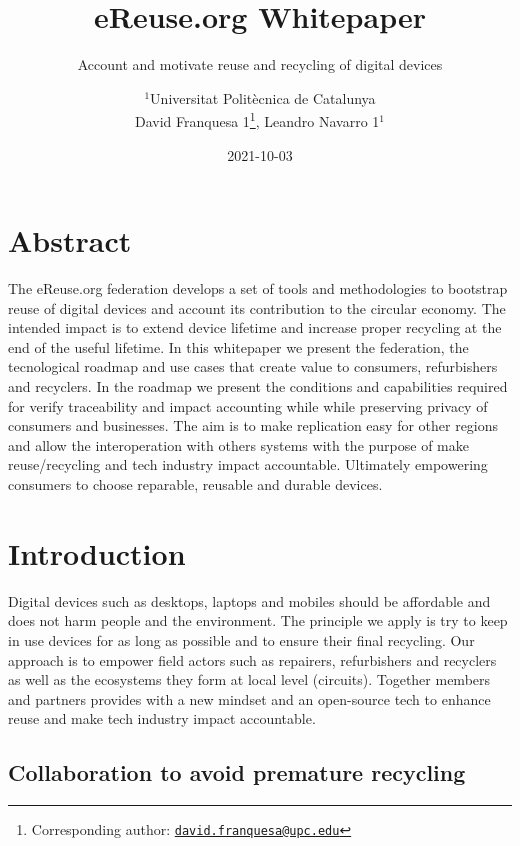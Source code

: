 \documentclass[
]{book}
\title{eReuse.org Whitepaper}
\subtitle{Account and motivate reuse and recycling of digital devices}
\author{\(^1\)Universitat Politècnica de Catalunya\\
David Franquesa 1\footnote{Corresponding author: \href{mailto:david.franquesa@upc.edu}{\nolinkurl{david.franquesa@upc.edu}}}, Leandro Navarro 1\(^1\)}
\date{2021-10-03}
\begin{document}
\maketitle

{
\setcounter{tocdepth}{1}
\tableofcontents
}
\hypertarget{abstract}{%
\chapter*{Abstract}\label{abstract}}

The eReuse.org federation develops a set of tools and methodologies to bootstrap reuse of digital devices and account its contribution to the circular economy. The intended impact is to extend device lifetime and increase proper recycling at the end of the useful lifetime. In this whitepaper we present the federation, the tecnological roadmap and use cases that create value to consumers, refurbishers and recyclers. In the roadmap we present the conditions and capabilities required for verify traceability and impact accounting while while preserving privacy of consumers and businesses. The aim is to make replication easy for other regions and allow the interoperation with others systems with the purpose of make reuse/recycling and tech industry impact accountable. Ultimately empowering consumers to choose reparable, reusable and durable devices.

\hypertarget{introduction}{%
\chapter{Introduction}\label{introduction}}

Digital devices such as desktops, laptops and mobiles should be affordable and does not harm people and the environment. The principle we apply is try to keep in use devices for as long as possible and to ensure their final recycling. Our approach is to empower field actors such as repairers, refurbishers and recyclers as well as the ecosystems they form at local level (circuits). Together members and partners provides with a new mindset and an open-source tech to enhance reuse and make tech industry impact accountable.

\hypertarget{collaboration-to-avoid-premature-recycling}{%
\section{Collaboration to avoid premature recycling}\label{collaboration-to-avoid-premature-recycling}}
\end{document}
